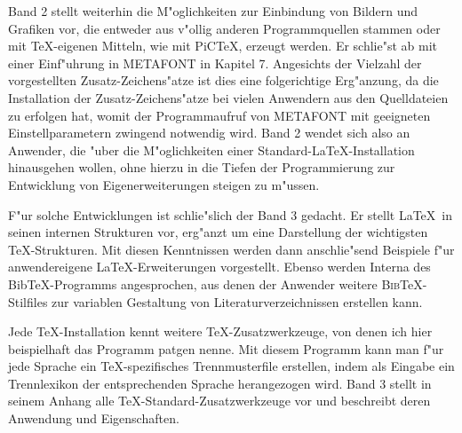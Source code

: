 \documentclass{article}
\begin{document}
Band 2 stellt weiterhin die M"oglichkeiten zur Einbindung von Bildern und
Grafiken vor, die entweder aus v"ollig anderen Programmquellen stammen oder
mit \TeX-eigenen Mitteln, wie mit PiC\TeX, erzeugt werden.
Er schlie"st ab mit einer Einf"uhrung in METAFONT in Kapitel 7. Angesichts der
Vielzahl der vorgestellten Zusatz-Zeichens"atze ist dies eine folgerichtige
Erg"anzung, da die Installation der Zusatz-Zeichens"atze bei vielen Anwendern
aus den Quelldateien zu erfolgen hat, womit der Programmaufruf von METAFONT
mit geeigneten Einstellparametern zwingend notwendig wird.
Band 2 wendet sich also an Anwender, die "uber die M"oglichkeiten 
einer Standard-\LaTeX-Installation hinausgehen wollen, ohne hierzu
in die Tiefen der Programmierung zur Entwicklung von Eigenerweiterungen
steigen zu m"ussen.

F"ur solche Entwicklungen ist schlie"slich der Band 3 gedacht. Er stellt
\LaTeX\ in seinen internen Strukturen vor, erg"anzt um eine Darstellung
der wichtigsten \TeX-Strukturen. Mit diesen Kenntnissen werden dann
anschlie"send Beispiele f"ur anwendereigene \LaTeX-Erweiterungen vorgestellt.
Ebenso werden Interna des Bib\TeX-Programms angesprochen, aus denen
der Anwender weitere \textsc{Bib}\TeX-Stilfiles zur variablen Gestaltung
von Literaturverzeichnissen erstellen kann.

Jede \TeX-Installation kennt weitere  \TeX-Zusatzwerkzeuge, von denen ich hier
beispielhaft das Programm patgen nenne. Mit diesem Programm kann man
f"ur jede Sprache ein \TeX-spezifisches Trennmusterfile erstellen,
indem als Eingabe ein Trennlexikon der entsprechenden Sprache herangezogen
wird. Band 3 stellt in seinem Anhang alle \TeX-Standard-Zusatzwerkzeuge vor und
beschreibt deren Anwendung und Eigenschaften.
\end{document}
